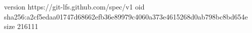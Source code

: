 version https://git-lfs.github.com/spec/v1
oid sha256:a2cf5edaa01747d68662efb36e89979c4060a373e4615268d0ab798bc8bd654e
size 216111
